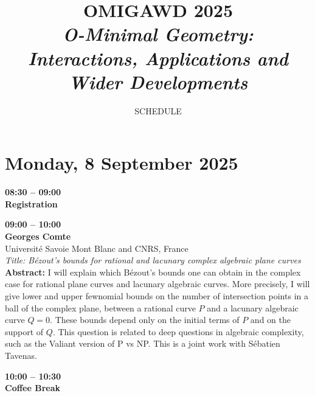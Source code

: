 \documentclass[10pt,a4paper]{article}
\title{OMIGAWD 2025 \\ \small\textit{O-Minimal Geometry: Interactions, Applications and Wider Developments}}
\author{SCHEDULE}
\date{}
\begin{document}
\maketitle

\tableofcontents

\newpage

\section{Monday, 8 September 2025}
\begin{tcolorbox}[talkbox]
\textbf{08:30 -- 09:00} \\
\textbf{Registration}
\end{tcolorbox}
\begin{tcolorbox}[talkbox]
\textbf{09:00 -- 10:00} \\
\textbf{Georges Comte} \\
Université Savoie Mont Blanc and CNRS, France \\
\textit{Title: Bézout's bounds for rational and lacunary complex algebraic plane curves} \\
\textbf{Abstract:} I will explain which Bézout's bounds one can obtain in the complex case for rational plane curves and lacunary algebraic curves. More precisely, I will give lower and upper fewnomial bounds on the number of intersection points in a ball of the complex plane, between a rational curve $P$ and a lacunary algebraic curve $Q=0$. These bounds depend only on the initial terms of $P$ and on the support of $Q$. This question is related to deep questions in algebraic complexity, such as the Valiant version of P vs NP. This is a joint work with Sébatien Tavenas.
\end{tcolorbox}
\begin{tcolorbox}[talkbox]
\textbf{10:00 -- 10:30} \\
\textbf{Coffee Break}
\end{tcolorbox}
\end{document}
